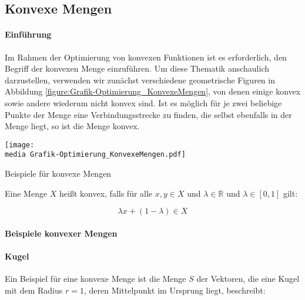 \subsection{Konvexe Mengen}

\paragraph{Einführung}

Im Rahmen der Optimierung von konvexen Funktionen ist es erforderlich, den Begriff der konvexen Menge einzuführen. Um diese Thematik anschaulich darzustellen, verwenden wir zunächst verschiedene geometrische Figuren in Abbildung \ref{figure:Grafik-Optimierung_KonvexeMengen}, von denen einige konvex sowie andere wiederum nicht konvex sind.
Ist es möglich für je zwei beliebige Punkte der Menge eine Verbindungsstrecke zu finden, die selbst ebenfalls in der Menge liegt, so ist die Menge konvex.

\begin{dsafigure}
\begin{center}
\texttt{[image: \\media Grafik-Optimierung\_KonvexeMengen.pdf]}
\label{figure:Grafik-Optimierung_KonvexeMengen}
\caption{Beispiele für konvexe Mengen}
\end{center}
\end{dsafigure}

\begin{Def}

Eine Menge $X$ heißt konvex, falls für alle $x, y \in X$ und $\lambda \in \mathbb{R}$ und $\lambda \in [0,1]$ gilt:

\begin{equation}
\lambda x + (1 - \lambda) \in X
\end{equation}

\end{Def}

\paragraph{Beispiele konvexer Mengen}

\paragraph{Kugel}

Ein Beispiel für eine konvexe Menge ist die Menge $S$ der Vektoren, die eine Kugel mit dem Radius $r = 1$, deren Mittelpunkt im Ursprung liegt, beschreibt:

